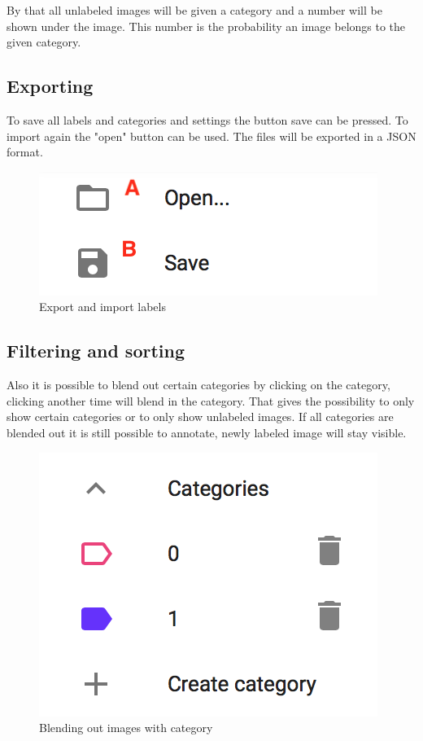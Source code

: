 By that all unlabeled images will be given a category and a number will be shown under the image. This number is the probability an image belongs to the given category.

\subsection{Exporting}

To save all labels and categories and settings the button save can be pressed. To import again the "open" button can be used. The files will be exported in a JSON format.

\begin{figure}[H]
	\centering
	\includegraphics[scale=0.8]{bilder/cyto/OpenSave.png}
	\caption{Export and import labels}
	\label{fig:ExportImport}
\end{figure}

\subsection{Filtering and sorting}
 
Also it is possible to blend out certain categories by
clicking on the category, clicking another time will blend
in the category. That gives the possibility to only show
certain categories or to only show unlabeled images.
If all categories are blended out it is still possible to
annotate, newly labeled image will stay visible.
 
\begin{figure}[H]
 	\centering
 	\includegraphics[scale=0.8]{bilder/cyto/BlendedOut.png}
 	\caption{Blending out images with category}
 	\label{fig:BlendingOut}
\end{figure}
  
